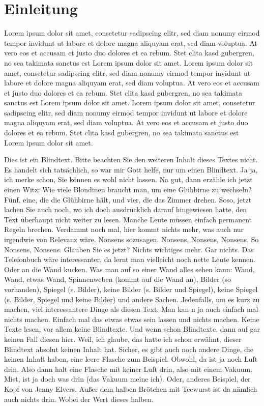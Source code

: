 \chapter{Einleitung}
\label{scr:Einleitung}
Lorem ipsum dolor sit amet, consetetur sadipscing elitr, sed diam nonumy eirmod tempor invidunt ut labore et dolore magna aliquyam erat, sed diam voluptua. At vero eos et accusam et justo duo dolores et ea rebum. Stet clita kasd gubergren, no sea takimata sanctus est Lorem ipsum dolor sit amet. Lorem ipsum dolor sit amet, consetetur sadipscing elitr, sed diam nonumy eirmod tempor invidunt ut labore et dolore magna aliquyam erat, sed diam voluptua. At vero eos et accusam et justo duo dolores et ea rebum. Stet clita kasd gubergren, no sea takimata sanctus est Lorem ipsum dolor sit amet. Lorem ipsum dolor sit amet, consetetur sadipscing elitr, sed diam nonumy eirmod tempor invidunt ut labore et dolore magna aliquyam erat, sed diam voluptua. At vero eos et accusam et justo duo dolores et ea rebum. Stet clita kasd gubergren, no sea takimata sanctus est Lorem ipsum dolor sit amet.\par

Dies ist ein Blindtext. Bitte beachten Sie den weiteren Inhalt dieses Textes nicht. Es handelt sich tatsächlich, so war mir Gott helfe, nur um einen Blindtext. Ja ja, ich merke schon, Sie können es wohl nicht lassen. Na gut, dann erzähle ich jetzt einen Witz: Wie viele Blondinen braucht man, um eine Glühbirne zu wechseln? Fünf, eine, die die Glühbirne hält, und vier, die das Zimmer drehen. Soso, jetzt lachen Sie auch noch, wo ich doch ausdrücklich darauf hingewiesen hatte, den Text überhaupt nicht weiter zu lesen. Manche Leute müssen einfach permanent Regeln brechen. Verdammt noch mal, hier kommt nichts mehr, was auch nur irgendwie von Relevanz wäre. Nonsens sozusagen. Nonsens, Nonsens, Nonsens. So  Nonsens, Nonsens. Glauben Sie es jetzt? Nichts wichtiges mehr. Gar nichts. Das Telefonbuch wäre interessanter, da lernt man vielleicht noch nette Leute kennen. Oder an die Wand kucken. Was man auf so einer Wand alles sehen kann: Wand, Wand, etwas Wand, Spinnenweben (kommt auf die Wand an), Bilder (so vorhanden), Spiegel (s. Bilder), keine Bilder (s. Bilder und Spiegel), keine Spiegel (s. Bilder, Spiegel und keine Bilder) und andere Sachen. Jedenfalls, um es kurz zu machen, viel interessantere Dinge als diesen Text. Man kan n ja auch einfach mal nichts machen. Einfach mal das etwas etwas sein lassen und nichts machen. Keine Texte lesen, vor allem keine Blindtexte. Und wenn schon Blindtexte, dann auf gar keinen Fall diesen hier. Weil, ich glaube, das hatte ich schon erwähnt, dieser Blindtext absolut keinen Inhalt hat. Sicher, es gibt auch noch andere Dinge, die keinen Inhalt haben, eine leere Flasche zum Beispiel. Obwohl, da ist ja noch Luft drin. Also dann halt eine Flasche mit keiner Luft drin, also mit einem Vakuum. Mist, ist ja doch was drin (das Vakuum meine ich). Oder, anderes Beispiel, der Kopf von Jenny Elvers. Außer dem halben Brötchen mit Teewurst ist da nämlich auch nichts drin. Wobei der Wert dieses halben.